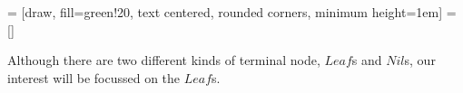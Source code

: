 \documentclass{article}
\newcommand{\Conid}[1]{\mathit{#1}}
\begin{document}
 = [draw, fill=green!20, 
    text centered, rounded corners, minimum height=1em]
 = []
\begin{center}
\end{center}

Although there are two different kinds of terminal node, \ensuremath{\Conid{Leaf}}s and \ensuremath{\Conid{Nil}}s, our interest will be focussed on the \ensuremath{\Conid{Leaf}}s.
\end{document}
